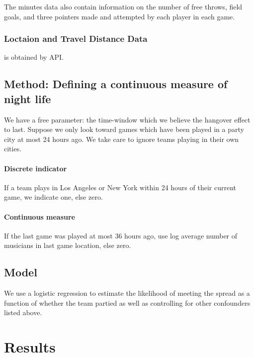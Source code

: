 \documentclass[letterpaper,12pt]{article}
\begin{document}
The minutes data also contain information on the number of free throws, field goals, and
three pointers made and attempted by each player in each game.

\subsubsection{Loctaion and Travel Distance Data} is obtained
by API.

\subsection{Method: Defining a continuous measure of night life}

We have a free parameter: the time-window which we believe the hangover effect
to last. Suppose we only look toward games which have been played in a party
city at most 24 hours ago. We take care to ignore
teams playing in their own cities.

\paragraph{Discrete indicator}
If a team plays in Los Angeles or New York within 24 hours of their current game,
we indicate one, else zero.

\paragraph{Continuous measure}
If the last game was played at most 36 hours ago, use log average number
of musicians in last game location, else zero.

\subsection{Model} We use a logistic regression to estimate the likelihood of meeting
the spread as a function of whether the team partied as well as controlling for other confounders
listed above.

\section{Results}
\end{document}
